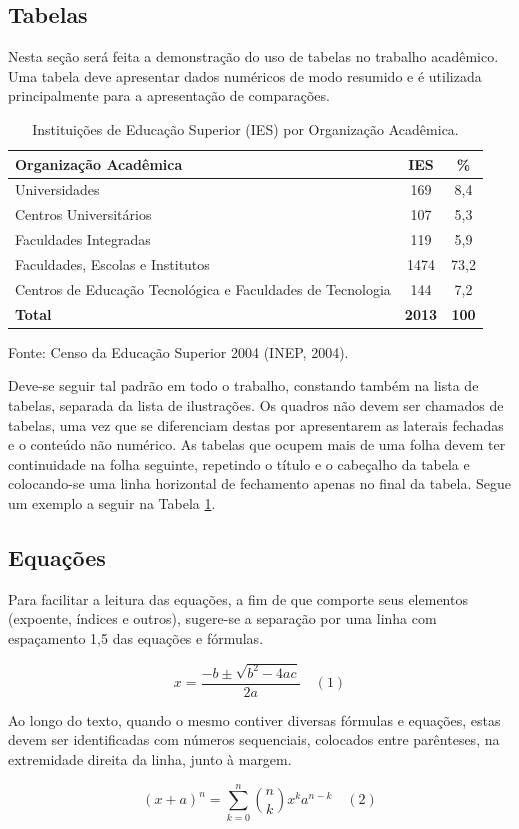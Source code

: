 \subsection{Tabelas}
Nesta seção será feita a demonstração do uso de tabelas no trabalho acadêmico.  Uma tabela deve apresentar dados numéricos de modo resumido e é utilizada principalmente para a apresentação de comparações. 

\begin{table}[H]
    \centering
    \caption{Instituições de Educação Superior (IES) por Organização Acadêmica. }
    \label{tab:ies_org}
    \begin{tabular}{lcc}
        \toprule
        \textbf{Organização Acadêmica} & \textbf{IES} & \textbf{\%} \\
        \midrule
        Universidades & 169 & 8,4 \\
        Centros Universitários & 107 & 5,3 \\
        Faculdades Integradas & 119 & 5,9 \\
        Faculdades, Escolas e Institutos & 1474 & 73,2 \\
        Centros de Educação Tecnológica e Faculdades de Tecnologia & 144 & 7,2 \\
        \midrule
        \textbf{Total} & \textbf{2013} & \textbf{100} \\
        \bottomrule
    \end{tabular}
    \footnotesize
    Fonte: Censo da Educação Superior 2004 (INEP, 2004). 
\end{table}
Deve-se seguir tal padrão em todo o trabalho, constando também na lista de tabelas, separada da lista de ilustrações.  Os quadros não devem ser chamados de tabelas, uma vez que se diferenciam destas por apresentarem as laterais fechadas e o conteúdo não numérico.  As tabelas que ocupem mais de uma folha devem ter continuidade na folha seguinte, repetindo o título e o cabeçalho da tabela e colocando-se uma linha horizontal de fechamento apenas no final da tabela.  Segue um exemplo a seguir na Tabela \ref{tab:ies_org}. 

\subsection{Equações}
Para facilitar a leitura das equações, a fim de que comporte seus elementos (expoente, índices e outros), sugere-se a separação por uma linha com espaçamento 1,5 das equações e fórmulas. 

$$ x=\frac{-b\pm\sqrt{b^2-4ac}}{2a} \quad (1) $$

Ao longo do texto, quando o mesmo contiver diversas fórmulas e equações, estas devem ser identificadas com números sequenciais, colocados entre parênteses, na extremidade direita da linha, junto à margem. 

$$ (x+a)^n=\sum_{k=0}^n \binom{n}{k}x^k a^{n-k} \quad (2) $$
